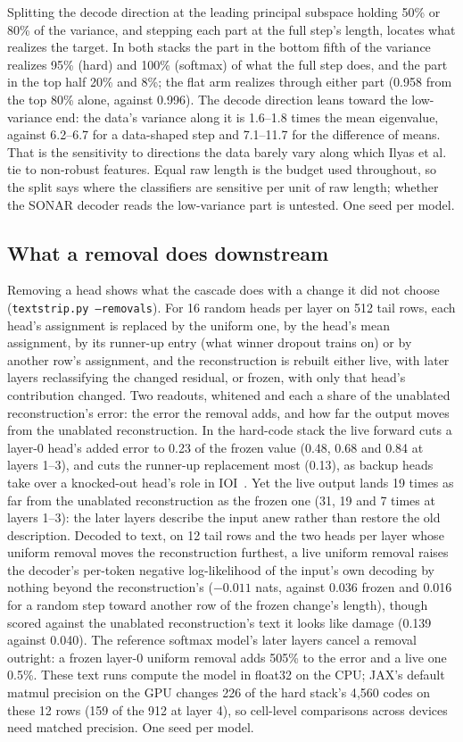 Splitting the decode direction at the leading principal subspace holding
50\% or 80\% of the variance, and stepping each part at the full step's
length, locates what realizes the target. In both stacks the part in the
bottom fifth of the variance realizes 95\% (hard) and 100\% (softmax) of
what the full step does, and the part in the top half 20\% and 8\%; the
flat arm realizes through either part (0.958 from the top 80\% alone,
against 0.996). The decode direction leans toward the low-variance end:
the data's variance along it is 1.6--1.8 times the mean eigenvalue,
against 6.2--6.7 for a data-shaped step and 7.1--11.7 for the difference
of means. That is the sensitivity to directions the data barely vary
along which Ilyas et al.~\cite{ilyas2019} tie to non-robust features.
Equal raw length is the budget used throughout, so the split says where
the classifiers are sensitive per unit of raw length; whether the SONAR
decoder reads the low-variance part is untested. One seed per model.

\subsection{What a removal does downstream}
\label{sec:removals}

Removing a head shows what the cascade does with a change it did not
choose (\texttt{textstrip.py --removals}). For 16 random heads per layer
on 512 tail rows, each head's assignment is replaced by the uniform one,
by the head's mean assignment, by its runner-up entry (what winner
dropout trains on) or by another row's assignment, and the
reconstruction is rebuilt either live, with later layers reclassifying
the changed residual, or frozen, with only that head's contribution
changed. Two readouts, whitened and each a share of the unablated
reconstruction's error: the error the removal adds, and how far the
output moves from the unablated reconstruction. In the hard-code stack
the live forward cuts a layer-0 head's added error to 0.23 of the frozen
value (0.48, 0.68 and 0.84 at layers 1--3), and cuts the runner-up
replacement most (0.13), as backup heads take over a knocked-out head's
role in IOI~\cite{wang2023ioi}. Yet the live output lands 19 times as far
from the unablated reconstruction as the frozen one (31, 19 and 7 times
at layers 1--3): the later layers describe the input anew rather than
restore the old description. Decoded to text, on 12 tail rows and the
two heads per layer whose uniform removal moves the reconstruction
furthest, a live uniform removal raises the decoder's per-token negative
log-likelihood of the input's own decoding by nothing beyond the
reconstruction's ($-0.011$ nats, against 0.036 frozen and 0.016 for a
random step toward another row of the frozen change's length), though
scored against the unablated reconstruction's text it looks like damage
(0.139 against 0.040). The reference softmax model's later layers cancel
a removal outright: a frozen layer-0 uniform removal adds 505\% to the
error and a live one 0.5\%. These text runs compute the model in float32
on the CPU; JAX's default matmul precision on the GPU changes 226 of the
hard stack's 4{,}560 codes on these 12 rows (159 of the 912 at layer 4),
so cell-level comparisons across devices need matched precision. One
seed per model.

